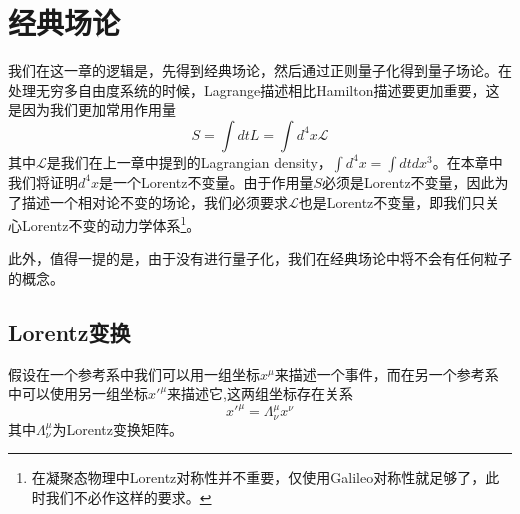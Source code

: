 \chapter{经典场论}
我们在这一章的逻辑是，先得到经典场论，然后通过正则量子化得到量子场论。在处理无穷多自由度系统的时候，Lagrange描述相比Hamilton描述要更加重要，这是因为我们更加常用作用量
\begin{equation}
    S=\int dt L=\int d^{4}x\mathcal{L}
\end{equation}
其中$\mathcal{L}$是我们在上一章中提到的Lagrangian density，$\int d^{4}x=\int dt dx^{3}$。在本章中我们将证明$ d^{4}x$是一个Lorentz不变量。由于作用量$S$必须是Lorentz不变量，因此为了描述一个相对论不变的场论，我们必须要求$\mathcal{L}$也是Lorentz不变量，即我们只关心Lorentz不变的动力学体系\footnote{在凝聚态物理中Lorentz对称性并不重要，仅使用Galileo对称性就足够了，此时我们不必作这样的要求。}。

此外，值得一提的是，由于没有进行量子化，我们在经典场论中将不会有任何粒子的概念。
\section{Lorentz变换}
假设在一个参考系中我们可以用一组坐标$x^{\mu}$来描述一个事件，而在另一个参考系中可以使用另一组坐标$x'^{\mu}$来描述它,这两组坐标存在关系
\begin{equation}
    x'^{\mu}=\Lambda^{\mu}_{\nu}x^{\nu}
\end{equation}
其中$\Lambda^{\mu}_{\nu}$为Lorentz变换矩阵。

